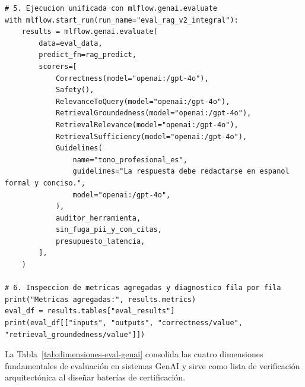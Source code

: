 \begin{lstlisting}
# 5. Ejecucion unificada con mlflow.genai.evaluate
with mlflow.start_run(run_name="eval_rag_v2_integral"):
    results = mlflow.genai.evaluate(
        data=eval_data,
        predict_fn=rag_predict,
        scorers=[
            Correctness(model="openai:/gpt-4o"),
            Safety(),
            RelevanceToQuery(model="openai:/gpt-4o"),
            RetrievalGroundedness(model="openai:/gpt-4o"),
            RetrievalRelevance(model="openai:/gpt-4o"),
            RetrievalSufficiency(model="openai:/gpt-4o"),
            Guidelines(
                name="tono_profesional_es",
                guidelines="La respuesta debe redactarse en espanol formal y conciso.",
                model="openai:/gpt-4o",
            ),
            auditor_herramienta,
            sin_fuga_pii_y_con_citas,
            presupuesto_latencia,
        ],
    )

# 6. Inspeccion de metricas agregadas y diagnostico fila por fila
print("Metricas agregadas:", results.metrics)
eval_df = results.tables["eval_results"]
print(eval_df[["inputs", "outputs", "correctness/value", "retrieval_groundedness/value"]])
\end{lstlisting}

La Tabla~\ref{tab:dimensiones-eval-genai} consolida las cuatro dimensiones fundamentales de evaluación en sistemas GenAI y sirve como lista de verificación arquitectónica al diseñar baterías de certificación.

